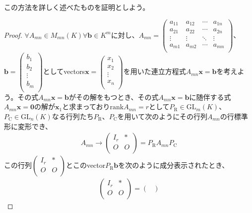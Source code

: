 \documentclass[dvipdfmx]{jsarticle}
\begin{document}
この方法を詳しく述べたものを証明としよう。
\begin{proof}
$\forall A_{mn} \in M_{mn}(K)\forall\mathbf{b} \in K^{m}$に対し、$A_{mn} = \begin{pmatrix}
a_{11} & a_{12} & \cdots & a_{1n} \\
a_{21} & a_{22} & \cdots & a_{2n} \\
 \vdots & \vdots & \ddots & \vdots \\
a_{m1} & a_{m2} & \cdots & a_{mn} \\
\end{pmatrix}$、$\mathbf{b} = \begin{pmatrix}
b_{1} \\
b_{2} \\
 \vdots \\
b_{m} \\
\end{pmatrix}$としてvectors$\mathbf{x} = \begin{pmatrix}
x_{1} \\
x_{2} \\
 \vdots \\
x_{n} \\
\end{pmatrix}$を用いた連立方程式$A_{mn}\mathbf{x} = \mathbf{b}$を考えよう。その式$A_{mn}\mathbf{x} = \mathbf{b}$がその解をもつとき、その式$A_{mn}\mathbf{x} = \mathbf{b}$に随伴する式$A_{mn}\mathbf{x} = \mathbf{0}$の解が$\mathbf{x}_{1}$と求まっており${\mathrm{rank}}A_{mn} = r$として$P_{\mathrm{R}} \in {\mathrm{GL}}_{m}(K)$、$P_{\mathrm{C}} \in {\mathrm{GL}}_{n}(K)$なる行列たち$P_{\mathrm{R}}$、$P_{\mathrm{C}}$を用いて次のようにその行列$A_{mn}$の行標準形に変形でき、
\begin{align*}
A_{mn} \rightarrow \begin{pmatrix}
I_{r} & * \\
O & O \\
\end{pmatrix} = P_{\mathrm{R}}A_{mn}P_{\mathrm{C}}
\end{align*}
この行列$\begin{pmatrix}
I_{r} & * \\
O & O \\
\end{pmatrix}$とこのvector$P_{\mathrm{R}}\mathbf{b}$を次のように成分表示されたとき、
\begin{align*}
\begin{pmatrix}
I_{r} & * \\
O & O \\
\end{pmatrix} = \begin{pmatrix}

\end{pmatrix}
\end{align*}
\end{proof}
\end{document}

